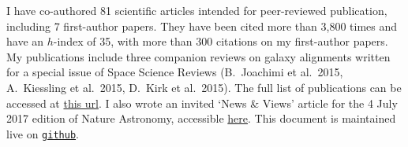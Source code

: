 I have co-authored 81 scientific articles intended for peer-reviewed 
publication, including 7 first-author papers. They have been cited more than 
3,800 times and have an $h$-index of 35, with more than 300 citations on my 
first-author papers. My publications include three companion reviews on galaxy 
alignments written for a special issue of Space Science Reviews (B.\ Joachimi et 
al.\ 2015, A.\ Kiessling et al.\ 2015, D.\ Kirk et al.\ 2015). The full list of 
publications can be accessed at \href{https://goo.gl/LAu9G4}{this url}. I also 
wrote an invited `News \& Views' article for the 4 July 2017 edition of Nature 
Astronomy, accessible 
\href{https://www.nature.com/articles/s41550-017-0181}{here}.
%
This document is maintained live on
\href{https://github.com/cristobal-sifon/cv/blob/master/Sifon_publications.pdf}{\texttt{github}}.

